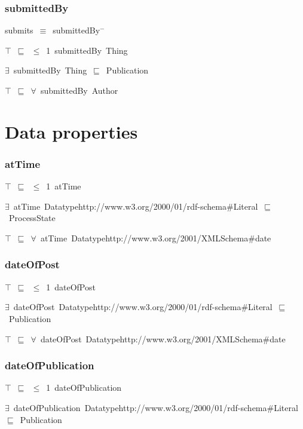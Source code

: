 \documentclass{article}
\begin{document}
\subsubsection*{submittedBy}

submits~\ensuremath{\equiv}~submittedBy\ensuremath{^-}

\ensuremath{\top}~\ensuremath{\sqsubseteq}~\ensuremath{\leq}~1~submittedBy~Thing

\ensuremath{\exists}~submittedBy~Thing~\ensuremath{\sqsubseteq}~Publication

\ensuremath{\top}~\ensuremath{\sqsubseteq}~\ensuremath{\forall}~submittedBy~Author

\section*{Data properties}\subsubsection*{atTime}

\ensuremath{\top}~\ensuremath{\sqsubseteq}~\ensuremath{\leq}~1~atTime

\ensuremath{\exists}~atTime~Datatypehttp://www.w3.org/2000/01/rdf-schema#Literal~\ensuremath{\sqsubseteq}~ProcessState

\ensuremath{\top}~\ensuremath{\sqsubseteq}~\ensuremath{\forall}~atTime~Datatypehttp://www.w3.org/2001/XMLSchema#date

\subsubsection*{dateOfPost}

\ensuremath{\top}~\ensuremath{\sqsubseteq}~\ensuremath{\leq}~1~dateOfPost

\ensuremath{\exists}~dateOfPost~Datatypehttp://www.w3.org/2000/01/rdf-schema#Literal~\ensuremath{\sqsubseteq}~Publication

\ensuremath{\top}~\ensuremath{\sqsubseteq}~\ensuremath{\forall}~dateOfPost~Datatypehttp://www.w3.org/2001/XMLSchema#date

\subsubsection*{dateOfPublication}

\ensuremath{\top}~\ensuremath{\sqsubseteq}~\ensuremath{\leq}~1~dateOfPublication

\ensuremath{\exists}~dateOfPublication~Datatypehttp://www.w3.org/2000/01/rdf-schema#Literal~\ensuremath{\sqsubseteq}~Publication
\end{document}
